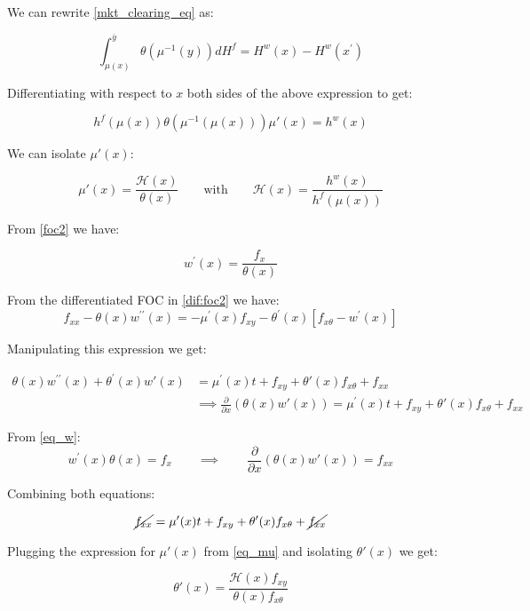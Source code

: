 \documentclass[12pt]{article}
\theoremstyle{definition}
\newcommand{\qiq}{\qquad \implies \qquad}
\begin{document}
We can rewrite \eqref{mkt_clearing_eq} as:

\begin{equation}\label{mkt_clearing_eq_2}
    \int_{\mu(x)}^{\overline{y}}{ \theta(\mu^{-1}(y)) dH^f }  =  H^{w}(x)-H^{w}\left(x^{\prime}\right)
\end{equation}

Differentiating with respect to $x$ both sides of the above expression to get:

$$h^f(\mu(x))\theta(\mu^{-1}(\mu(x)))\mu'(x) = h^w(x)$$

We can isolate $\mu'(x)$:

\begin{equation}\label{eq_mu}
\mu'(x) = \frac{\mathcal{H}(x)}{\theta(x)}\qquad \text{with} \qquad \mathcal{H}(x)= \frac{h^{w}(x)}{h^{f}(\mu(x))}    
\end{equation}


From \eqref{foc2} we have:

\begin{equation}\label{eq_w}
    w^{\prime}(x) =\frac{f_{x}}{\theta(x) }    
\end{equation}
 
From the differentiated FOC in \eqref{dif:foc2} we have:
$$f_{x x}-\theta(x) w^{\prime \prime}(x) =-\mu^{\prime}(x) f_{x y}-\theta^{\prime}(x)\left[f_{x \theta}-w^{\prime}(x)\right]$$
 
 Manipulating this expression we get:
 
 \begin{align*}
\theta(x) w^{\prime \prime}(x)+\theta^{\prime}(x) w'(x)&=\mu^{\prime}(x) t+f_{x y}+\theta'(x) f_{x \theta}+f_{x x}\\ &\implies \frac{\partial}{\partial x}\left(\theta(x)w'(x) \right)
=\mu^{\prime}(x) t+f_{x y}+\theta'(x) f_{x \theta}+f_{x x}
\end{align*}

From \eqref{eq_w}:
$$w^{\prime}(x)\theta(x) = f_{x}\qiq   \frac{\partial}{\partial x}\left(\theta(x)w'(x) \right)
= f_{xx}  $$

Combining both equations:

$$\cancel{f_{xx}} = \mu^{\prime}(x) t+f_{x y}+\theta'(x) f_{x \theta}+\cancel{f_{x x}}$$

Plugging the expression for $\mu'(x)$ from \eqref{eq_mu} and isolating $\theta'(x)$ we get:

\begin{equation}\label{eq_th}
    \theta'(x) = \frac{\mathcal{H}(x)f_{x y}}{\theta(x) f_{x \theta}}
\end{equation}
\end{document}

